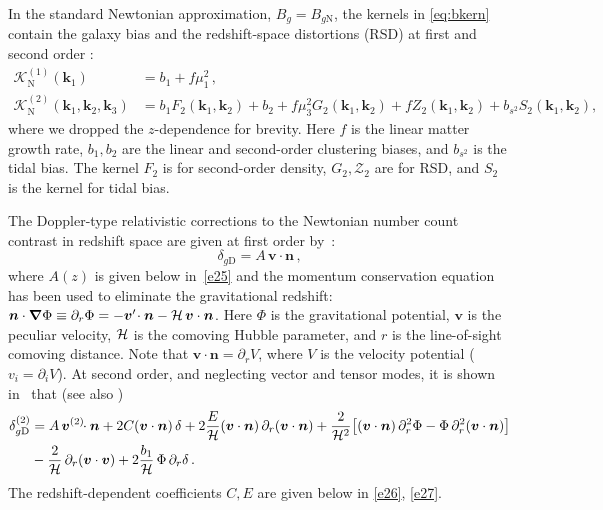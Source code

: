 In the standard Newtonian approximation, $B_g=B_{g{\mathrm{N}}}$, the kernels in \eqref{eq:bkern} contain the galaxy bias and the redshift-space distortions (RSD) at first and second order \cite{Bernardeau:2001qr, Karagiannis:2018jdt}:
\begin{align}
\mathcal{K}^{(1)}_{\mathrm{N}}(\bm{k}_{1}) &= b_{1}+f\mu_{1}^{2}\,,  \label{e15} \\ 
{\mathcal{K}^{(2)}_{\mathrm{N}}}(\bm{k}_{1}, \bm{k}_{2},{\bm{k}_3}) &= b_{1}F_{2}(\bm{k}_{1}, \bm{k}_{2}) + b_{2} + f\mu_{3}^{2}G_{2}(\bm{k}_{1}, \bm{k}_{2}) +{fZ_2}(\bm{k}_{1}, \bm{k}_{2})
+ b_{s^{2}}S_{2}(\bm{k}_{1}, \bm{k}_{2}) , \label{k2n}
\end{align}
where we dropped the $z$-dependence for brevity. Here $f$ is the linear matter growth rate, $b_1,b_2$ are the linear and second-order clustering biases, and $b_{s^{2}}$ is the tidal bias. The kernel  $F_2$ is for second-order density, $G_2 , \mathcal{Z}_2$ are for RSD,  and $S_2$  is the kernel for tidal bias.


The Doppler-type relativistic corrections to the Newtonian number count contrast in redshift space are  given {at first order by~\cite{Bonvin:2011bg}:}
\begin{equation}
\delta_{g\mathrm{D}} =  {A}\,\bm{v}\cdot\bm{n}\,,\label{dg1}
\end{equation}
{where $A(z)$ is given below in~\eqref{e25} and the momentum conservation equation has been used to  eliminate the gravitational redshift: $\bm{n}\cdot\bm{\nabla}\Phi\equiv \partial_r \Phi = -\bm{v}'\!\cdot\bm{n}-\mathcal{H}\,\bm{v}\cdot\bm{n} $.} Here $\Phi$ is the gravitational potential, $\bm{v}$ is the peculiar velocity,  $\mathcal{H}$ is the comoving Hubble parameter, and $r$ is the line-of-sight comoving distance.
Note that $\bm{v}\cdot\bm{n}=\partial_r V$, where $V$ is the velocity potential ($v_i=\partial_iV$). 
At second order, and neglecting vector and tensor modes, it is shown in~\cite{Clarkson:2018dwn}  that (see also \cite{DiDio:2018zmk}) 
\begin{align}
\delta^{(2)}_{g{\mathrm{D}}}&= A\, \bm{v}^{(2)}\!\!\cdot\bm{n}+2{C}(\bm{v}\cdot\bm{n})\,\delta +2 \frac{{E}}{\mathcal{H}}(\bm{v}\cdot\bm{n})\,\partial_r(\bm{v}\cdot\bm{n})
+ \frac{2}{\mathcal{H}^2}\big[(\bm{v}\cdot\bm{n}) \,\partial_r^2\Phi-\Phi\, \partial_r^2 (\bm{v}\cdot\bm{n}) \big]
\nonumber\\ \label{eq:dgsecond}
& - \frac{2}{\mathcal{H}}\,\partial_r (\bm{v}\cdot\bm{v}) + 2 \frac{b_1}{\mathcal{H}}\,\Phi\, \partial_r\delta \,. 
\end{align}
The redshift-dependent coefficients $C,E$ are  given below  in \eqref{e26}, \eqref{e27}.


